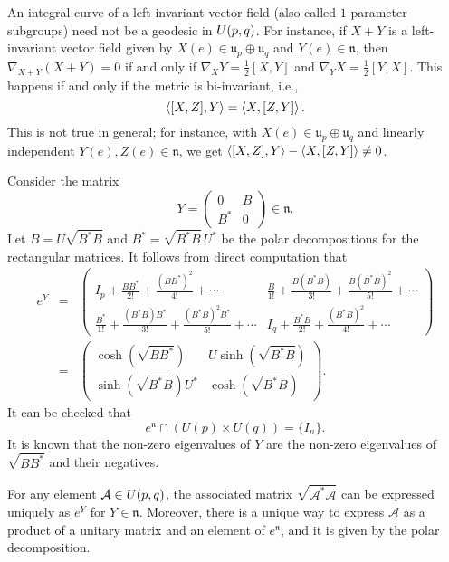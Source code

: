 \begin{rem}
    An integral curve of a left-invariant vector field (also called $1$-parameter subgroups) need not be a geodesic in $U(p,q)$. For instance, if $X+Y$ is a left-invariant vector field given by $X(e)\in\mathfrak{u}_p\oplus\mathfrak{u}_q$ and $Y(e)\in \mathfrak{n}$, then $\nabla_{X+Y}(X+Y)=0$ if and only if $\nabla_X Y=\frac{1}{2}[X,Y]$ and $\nabla_Y X=\frac{1}{2}[Y,X]$. This happens if and only if the metric is bi-invariant, i.e.,
    \begin{displaymath}
        \left\langle [X,Z],Y\right\rangle=\left\langle X, [Z,Y]\right\rangle.
    \end{displaymath} 
    This is not true in general; for instance, with $X(e)\in \mathfrak{u}_p\oplus\mathfrak{u}_q$ and linearly independent $Y(e),Z(e)\in \mathfrak{n}$, we get $\left\langle [X,Z],Y\right\rangle-\left\langle X, [Z,Y]\right\rangle\neq 0$.
\end{rem}

\hf Consider the matrix
\begin{displaymath}
    Y=\left(\begin{array}{cc}
    0 & B\\
    B^\ast & 0
    \end{array}\right)\in\mathfrak{n}.
\end{displaymath}
Let $B=U \sqrt{B^\ast B}$ and $B^\ast =\sqrt{B^\ast B}\,U^\ast$ be the polar decompositions for the rectangular matrices. It follows from direct computation that
\begin{eqnarray*}
    e^Y & = & \left(\begin{array}{cc}
    I_p+\frac{BB^\ast}{2!} + \frac{(BB^\ast)^2}{4!}+\cdots & \frac{B}{1!}+\frac{B (B^\ast  B)}{3!} + \frac{B (B^\ast B)^2 }{5!}+\cdots \\
    \frac{B^\ast}{1!}+\frac{(B^\ast B)B^\ast}{3!} + \frac{(B^\ast B)^2 B^\ast}{5!}+\cdots  & I_q+\frac{B^\ast B}{2!} + \frac{(B^\ast B)^2}{4!}+\cdots 
    \end{array}\right)\\
    & = & \left(\begin{array}{cc}
    \cosh(\sqrt{BB^\ast}) & U\sinh(\sqrt{B^\ast B})\\
    \sinh(\sqrt{B^\ast B})U^\ast & \cosh(\sqrt{B^\ast B})
    \end{array}\right).
\end{eqnarray*}
It can be checked that 
\begin{displaymath}
    e^\mathfrak{n}\cap \left(U(p)\times U(q)\right)=\{I_n\}.
\end{displaymath}
It is known that the non-zero eigenvalues of $Y$ are the non-zero eigenvalues of $\sqrt{BB^\ast}$ and their negatives. 
\begin{thm}\label{mainthm}
    For any element $\mathcal{A}\in U(p,q)$, the associated matrix $\sqrt{\mathcal{A}^\ast\mathcal{A}}$ can be expressed uniquely as $e^Y$ for $Y\in \mathfrak{n}$. Moreover, there is a unique way to express $\mathcal{A}$ as a product of a unitary matrix and an element of $e^\mathfrak{n}$, and it is given by the polar decomposition.
\end{thm}

